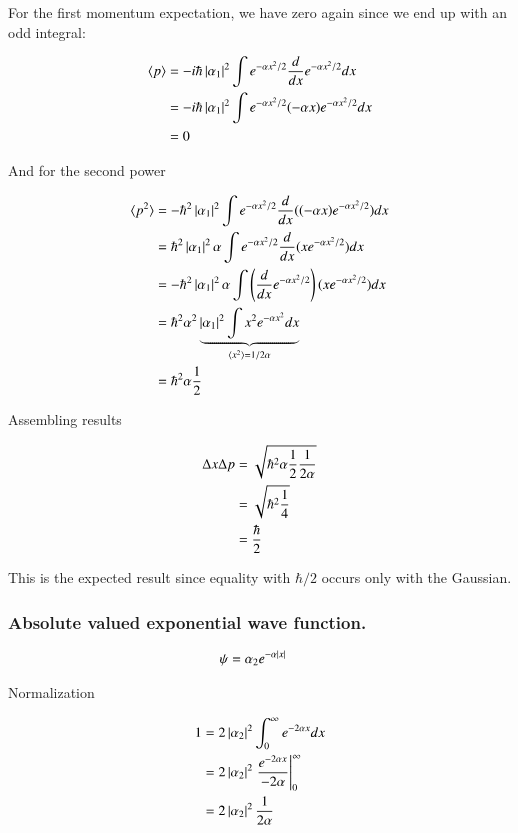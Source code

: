 \documentclass{article}
\newcommand{\expectation}[1]{\langle{#1}\rangle}
\begin{document}
For the first momentum expectation, we have zero again since we end up with an odd integral:

\begin{align*}
\expectation{p} 
&= -i \hbar \Abs{\alpha_1}^2 \int e^{-\alpha x^2 /2} \frac{d}{dx} e^{-\alpha x^2 /2} dx \\
&= -i \hbar \Abs{\alpha_1}^2 \int e^{-\alpha x^2 /2} (-\alpha x) e^{-\alpha x^2 /2} dx \\
&= 0
\end{align*}

And for the second power

\begin{align*}
\expectation{p^2} 
&= - \hbar^2 \Abs{\alpha_1}^2 \int e^{-\alpha x^2 /2} \frac{d}{dx} ((-\alpha x) e^{-\alpha x^2 /2}) dx \\
&= \hbar^2 \Abs{\alpha_1}^2 \alpha \int e^{-\alpha x^2 /2} \frac{d}{dx} (x e^{-\alpha x^2 /2}) dx \\
&= -\hbar^2 \Abs{\alpha_1}^2 \alpha \int \left(\frac{d}{dx}e^{-\alpha x^2 /2}\right) (x e^{-\alpha x^2 /2}) dx \\
&= \hbar^2 \alpha^2 \underbrace{\Abs{\alpha_1}^2 \int x^2 e^{-\alpha x^2} dx}_{\expectation{x^2} = 1/2\alpha} \\
&= \hbar^2 \alpha \inv{2}
\end{align*}

Assembling results

\begin{align*}
\Delta x \Delta p 
&= \sqrt{\hbar^2 \alpha \frac{1}{2} \frac{1}{2\alpha}} \\
&= \sqrt{\hbar^2 \frac{1}{4}} \\
&= \frac{\hbar}{2}
\end{align*}

This is the expected result since equality with $\hbar/2$ occurs only with the Gaussian.

\subsubsection{ Absolute valued exponential wave function. }

\begin{align*}
\psi &= \alpha_2 e^{-\alpha\left\lvert{x}\right\rvert}
\end{align*}

Normalization

\begin{align*}
1 
&= 2 \left\lvert{\alpha_2}\right\rvert^2 \int_0^\infty e^{-2 \alpha{x}} dx \\
&= 2 \left\lvert{\alpha_2}\right\rvert^2 \left. \frac{e^{-2 \alpha{x}}}{-2\alpha} \right\vert_0^\infty \\
&= 2 \left\lvert{\alpha_2}\right\rvert^2 \frac{1}{2\alpha}
\end{align*}
\end{document}
